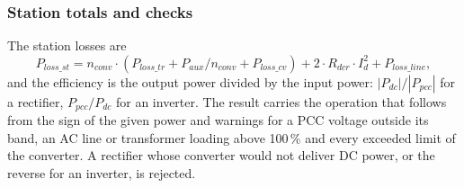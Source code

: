 \subsubsection{Station totals and checks}

The station losses are
\begin{equation}
  P_{loss\_st} = n_{conv} \cdot \left( P_{loss\_tr} + P_{aux}/n_{conv} + P_{loss\_cv} \right)
                 + 2 \cdot R_{dcr} \cdot I_d^2 + P_{loss\_line} ,
\end{equation}
and the efficiency is the output power divided by the input power: $|P_{dc}| / |P_{pcc}|$ for a rectifier,
$P_{pcc} / P_{dc}$ for an inverter. The result carries the operation that follows from the sign of the given power
and warnings for a PCC voltage outside its band, an AC line or transformer loading above 100\,\% and every exceeded
limit of the converter. A rectifier whose converter would not deliver DC power, or the reverse for an inverter, is
rejected.
